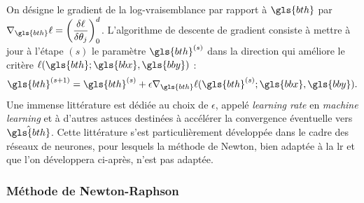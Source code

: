On désigne le gradient de la log-vraisemblance par rapport à $\gls{bth}$ par $\nabla_{\gls{bth}} \ell = \left( \dfrac{\delta \ell}{\delta \theta_j} \right)_0^d$. L'algorithme de descente de gradient consiste à mettre à jour à l'étape $(s)$ le paramètre $\gls{bth}^{(s)}$ dans la direction qui améliore le critère $\ell(\gls{bth};\gls{bbx},\gls{bby})$ : $$\gls{bth}^{(s+1)} = \gls{bth}^{(s)} + \epsilon \nabla_{\gls{bth}} \ell(\gls{bth}^{(s)};\gls{bbx},\gls{bby}).$$ Une immense littérature est dédiée au choix de $\epsilon$, appelé \textit{learning rate} en \textit{machine learning} et à d'autres astuces destinées à accélérer la convergence éventuelle vers $\hat{\gls{bth}}$. Cette littérature s'est particulièrement développée dans le cadre des réseaux de neurones, pour lesquels la méthode de Newton, bien adaptée à la \gls{lr} et que l'on développera ci-après, n'est pas adaptée.

\subsubsection{Méthode de Newton-Raphson}

